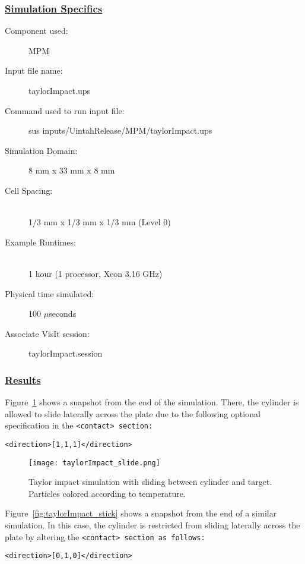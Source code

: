 \subsubsection*{\underline{Simulation Specifics}}
\begin{description} 
\item [Component used:] \hfill MPM
\item [Input file name:] \hfill taylorImpact.ups
\item [Command used to run input file:]\hfill sus inputs/UintahRelease/MPM/taylorImpact.ups
\item [Simulation Domain:]\hfill 8 mm x 33 mm x 8 mm

\item [Cell Spacing:]\hfill \\ 
  1/3 mm x 1/3 mm x 1/3 mm (Level 0)

\item [Example Runtimes:] \hfill \\
  1 hour   (1 processor, Xeon 3.16 GHz)\\

\item [Physical time simulated:] \hfill 100 $\mu$seconds

\item [Associate VisIt session:] \hfill taylorImpact.session

\end{description}

\subsubsection*{\underline{Results}}
Figure~\ref{fig:taylorImpact_slide} shows a snapshot from the end of the simulation.
There, the cylinder is allowed to slide laterally across the plate due
to the following optional specification in the \tt <contact> \normalfont
section:

\begin{Verbatim}[fontsize=\footnotesize]
        <direction>[1,1,1]</direction>
\end{Verbatim}

\begin{figure}
  \center
  \texttt{[image: taylorImpact\_slide.png]}
  \caption{Taylor impact simulation with sliding between cylinder and
           target.  Particles colored according to temperature.}
  \label{fig:taylorImpact_slide}
\end{figure}

Figure~\ref{fig:taylorImpact_stick} shows a snapshot from the end of a
similar simulation.  In this case, the cylinder is restricted from sliding
laterally across the plate by altering the \tt <contact> \normalfont
section as follows:
\begin{Verbatim}[fontsize=\footnotesize]
        <direction>[0,1,0]</direction>
\end{Verbatim}

